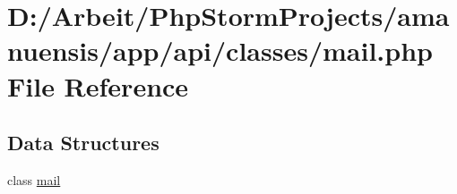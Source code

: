 \hypertarget{mail_8php}{}\section{D\+:/\+Arbeit/\+Php\+Storm\+Projects/amanuensis/app/api/classes/mail.php File Reference}
\label{mail_8php}
\subsection*{Data Structures}
\begin{DoxyCompactItemize}
\item 
class \hyperlink{classmail}{mail}
\end{DoxyCompactItemize}
